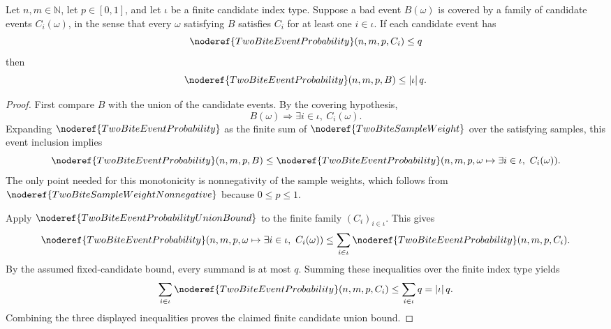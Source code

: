 \begin{helper}
Let \(n,m\in\mathbb N\), let \(p\in[0,1]\), and let \(\iota\) be a finite
candidate index type.  Suppose a bad event \(B(\omega)\) is covered by a
family of candidate events \(C_i(\omega)\), in the sense that every
\(\omega\) satisfying \(B\) satisfies \(C_i\) for at least one \(i\in\iota\).
If each candidate event has
\[
\noderef{TwoBiteEventProbability}(n,m,p,C_i)\le q
\]
then
\[
\noderef{TwoBiteEventProbability}(n,m,p,B)
\le |\iota|\,q .
\]
\end{helper}
\begin{proof}
First compare \(B\) with the union of the candidate events.  By the covering
hypothesis,
\[
B(\omega)\Rightarrow \exists i\in\iota,\ C_i(\omega).
\]
Expanding \(\noderef{TwoBiteEventProbability}\) as the finite sum of
\(\noderef{TwoBiteSampleWeight}\) over the satisfying samples, this event
inclusion implies
\[
\noderef{TwoBiteEventProbability}(n,m,p,B)
\le
\noderef{TwoBiteEventProbability}
  (n,m,p,\omega\mapsto \exists i\in\iota,\ C_i(\omega)).
\]
The only point needed for this monotonicity is nonnegativity of the sample
weights, which follows from \(\noderef{TwoBiteSampleWeightNonnegative}\)
because \(0\le p\le1\).

Apply \(\noderef{TwoBiteEventProbabilityUnionBound}\) to the finite family
\((C_i)_{i\in\iota}\).  This gives
\[
\noderef{TwoBiteEventProbability}
  (n,m,p,\omega\mapsto \exists i\in\iota,\ C_i(\omega))
\le
\sum_{i\in\iota}
  \noderef{TwoBiteEventProbability}(n,m,p,C_i).
\]
By the assumed fixed-candidate bound, every summand is at most \(q\).  Summing
these inequalities over the finite index type yields
\[
\sum_{i\in\iota}
  \noderef{TwoBiteEventProbability}(n,m,p,C_i)
\le
\sum_{i\in\iota} q
=|\iota|\,q.
\]
Combining the three displayed inequalities proves the claimed finite
candidate union bound.
\end{proof}
